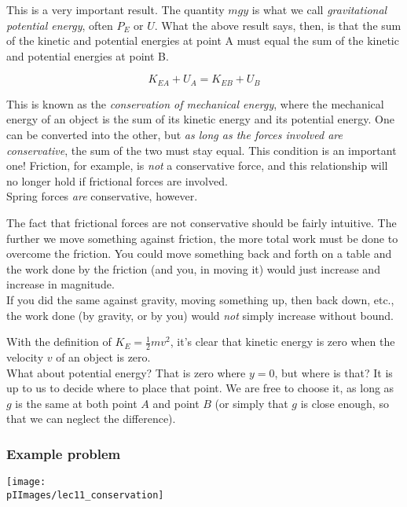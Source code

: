 This is a very important result. The quantity $m g y$ is what we call \emph{gravitational potential energy}, often $P_E$ or $U$. What the above result says, then, is that the sum of the kinetic and potential energies at point A must equal the sum of the kinetic and potential energies at point B.

\begin{equation}
K_{EA} + U_A = K_{EB} + U_B
\end{equation}

This is known as the \emph{conservation of mechanical energy}, where the mechanical energy of an object is the sum of its kinetic energy and its potential energy. One can be converted into the other, but \emph{as long as the forces involved are conservative}, the sum of the two must stay equal. This condition is an important one! Friction, for example, is \emph{not} a conservative force, and this relationship will no longer hold if frictional forces are involved.\\
Spring forces \emph{are} conservative, however.

The fact that frictional forces are not conservative should be fairly intuitive. The further we move something against friction, the more total work must be done to overcome the friction. You could move something back and forth on a table and the work done by the friction (and you, in moving it) would just increase and increase in magnitude.\\
If you did the same against gravity, moving something up, then back down, etc., the work done (by gravity, or by you) would \emph{not} simply increase without bound.

With the definition of $K_E = \frac{1}{2} m v^2$, it's clear that kinetic energy is zero when the velocity $v$ of an object is zero.\\
What about potential energy? That is zero where $y = 0$, but where is that? It is up to us to decide where to place that point. We are free to choose it, as long as $g$ is the same at both point $A$ and point $B$ (or simply that $g$ is close enough, so that we can neglect the difference).

\subsubsection{Example problem}

\begin{center}
\texttt{[image: \\pIImages/lec11\_conservation]}
\end{center}


